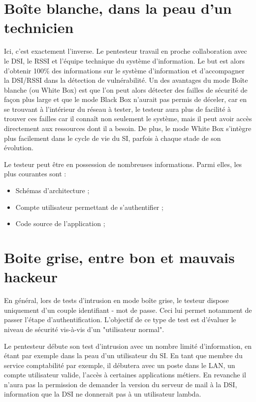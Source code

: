 \documentclass[a4paper]{memoir}
\begin{document}
\section{Boîte blanche, dans la peau d'un technicien} 

 Ici, c’est exactement l’inverse. Le pentesteur travail en proche collaboration avec le DSI, le RSSI et l’équipe technique du système d’information. Le but est alors d’obtenir 100\% des informations sur le système d’information et d’accompagner la DSI/RSSI dans la détection de vulnérabilité. Un des avantages du mode Boîte blanche (ou White Box) est que l’on peut alors détecter des failles de sécurité de façon plus large et que le mode Black Box n’aurait pas permis de déceler, car en se trouvant à l'intérieur du réseau à tester, le testeur aura plus de facilité à trouver ces failles car il connaît non seulement le système, mais il peut avoir accès directement aux ressources dont il a besoin. De plus, le mode White Box s’intègre plus facilement dans le cycle de vie du SI, parfois à chaque stade de son évolution. 

Le testeur peut être en possession de nombreuses informations. Parmi elles, les plus courantes sont :

\begin{itemize}
   \item Schémas d'architecture ;
   \item Compte utilisateur permettant de s'authentifier ;
   \item Code source de l'application ;
\end{itemize}

\section{Boite grise, entre bon et mauvais hackeur}

En général, lors de tests d'intrusion en mode boîte grise, le testeur dispose uniquement d'un couple identifiant - mot de passe. Ceci lui permet notamment de passer l'étape d'authentification.
L'objectif de ce type de test est d'évaluer le niveau de sécurité vis-à-vis d'un "utilisateur normal".

Le pentesteur débute son test d’intrusion avec un nombre limité d’information, en étant par exemple dans la peau d’un utilisateur du SI. En tant que membre du service comptabilité par exemple, il débutera avec un poste dans le LAN, un compte utilisateur valide, l’accès à certaines applications métiers. En revanche il n’aura pas la permission de demander la version du serveur de mail à la DSI, information que la DSI ne donnerait pas à un utilisateur lambda.
\end{document}
